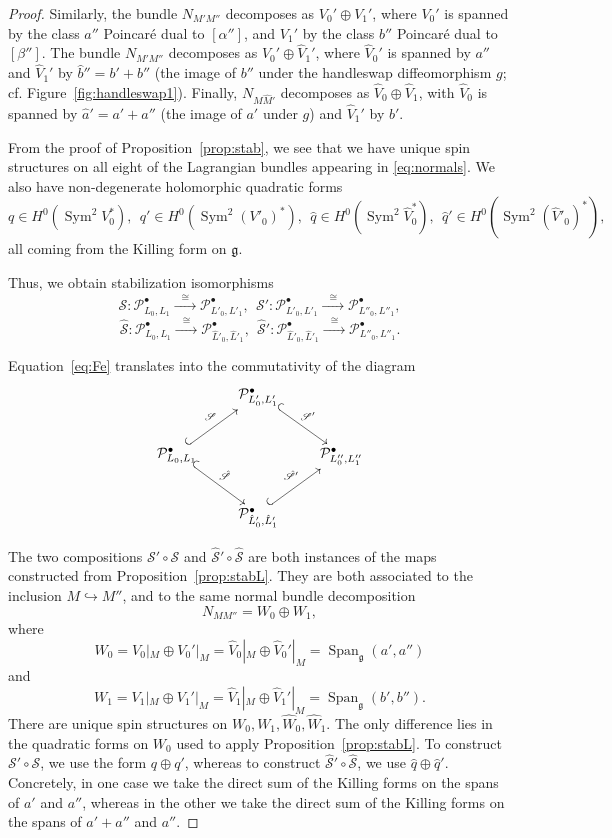 \documentclass [11pt]{amsart}
\theoremstyle{remark}
\def\g{\mathfrak{g}}
\def\Sym{{\operatorname{Sym}}}
\def\Stab{\mathscr{S}}
\def\Pb {\mathcal{P}^\bullet}
\def\Span{\operatorname{Span}}
\begin{document}
\begin{proof}
Similarly, the bundle $N_{M'M''}$ decomposes as $V_0' \oplus V_1'$, where $V_0'$ is spanned by  the class $a''$ Poincar\'e dual to $[\alpha'']$, and $V_1'$ by the class $b''$ Poincar\'e dual to $[\beta'']$. The  bundle $N_{M'M''}$ decomposes as $\widehat{V}_0' \oplus \widehat{V}_1'$, where $\widehat{V}_0'$ is spanned by $a''$  and $\widehat{V}_1'$ by $\hat{b}''= b' + b''$ (the image of $b''$ under the handleswap diffeomorphism $g$; cf. Figure~\ref{fig:handleswap1}). Finally, $N_{M \widehat{M}'}$ decomposes as $\widehat{V}_0 \oplus \widehat{V}_1$, with $\widehat{V}_0 $ is spanned by $\hat{a}'=a'+a''$ (the image of $a'$ under $g$) and $\widehat{V}_1'$ by $b'$. 

From the proof of Proposition~\ref{prop:stab}, we see that we have unique spin structures on all eight of the Lagrangian bundles appearing in \eqref{eq:normals}. We also have non-degenerate holomorphic quadratic forms
$$q \in H^0(\Sym^2 V_0^*), \ \ q' \in H^0(\Sym^2 (V'_0)^*), \ \ \hat{q} \in H^0(\Sym^2 \widehat{V}_0^*), \ \ \hat{q}' \in H^0(\Sym^2 (\widehat{V}'_0)^*),$$
all coming from the Killing form on $\g$.

Thus, we obtain stabilization isomorphisms
$$ \Stab: \Pb_{L_0, L_1} \xrightarrow{\phantom{b}\cong\phantom{b}} \Pb_{L'_0, L'_1}, \ \ \Stab': \Pb_{L'_0, L'_1} \xrightarrow{\phantom{b}\cong\phantom{b}} \Pb_{L''_0, L''_1},$$
$$ \hat{\Stab}: \Pb_{L_0, L_1} \xrightarrow{\phantom{b}\cong\phantom{b}} \Pb_{\hat{L}'_0, \hat{L}'_1}, \ \ \hat{\Stab}': \Pb_{\hat{L}'_0, \hat{L}'_1} \xrightarrow{\phantom{b}\cong\phantom{b}} \Pb_{L''_0, L''_1}.$$

Equation~\eqref{eq:Fe} translates into the commutativity of the diagram $$
\xymatrix{
& \Pb_{L'_0, L'_1}  \ar@{^{(}->}^{\Stab'} [rd] & \\
\Pb_{L_0, L_1} \ar@{^{(}->}^{\Stab} [ru]  \ar@{^{(}->}^{\hat{\Stab}} [rd] & & \Pb_{L_0'', L_1''} \\
& \Pb_{\hat{L}'_0, \hat{L}'_1}  \ar@{^{(}->}^{\hat{\Stab}'} [ru] &
}$$

The two compositions $\Stab' \circ \Stab$ and $\hat{\Stab}' \circ \hat{\Stab}$ are both instances of the  maps constructed from Proposition~\ref{prop:stabL}. They are both associated to the inclusion $M \hookrightarrow M''$, and to the same normal bundle decomposition
$$ N_{MM''} = W_0 \oplus W_1,$$
where
$$ W_0 = V_0|_{M} \oplus V_0'|_{M} =  \widehat{V}_0|_{M} \oplus \widehat{V}_0'|_{M} = \Span_{\g}(a', a'')$$
and
$$ W_1 = V_1|_{M} \oplus V_1' |_{M}= \widehat{V}_1|_{M} \oplus \widehat{V}_1'|_{M} = \Span_{\g}(b', b'').$$
There are unique spin structures on $W_0, W_1, \widehat{W}_0,  \widehat{W}_1$. The only difference lies in the quadratic forms on $W_0$ used to apply Proposition~\ref{prop:stabL}. To construct $\Stab' \circ \Stab$, we use the form $q \oplus q'$, whereas to construct $\hat{\Stab}' \circ \hat{\Stab}$, we use $\hat{q} \oplus \hat{q}'$. Concretely, in one case we take the direct sum of the Killing forms on the spans of $a'$ and $a''$, whereas in the other we take the direct sum of the Killing forms on the spans of $a' + a''$ and $a''$.


\end{proof}
\end{document}
